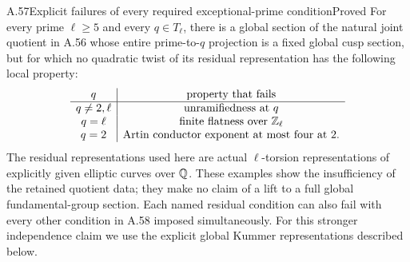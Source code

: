 \begin{statement}{A.57}{Explicit failures of every required exceptional-prime condition}{Proved}
For every prime $\ell\ge5$ and every $q\in T_\ell$, there is a
global section of the natural joint quotient in A.56 whose entire
prime-to-$q$ projection is a fixed global cusp section, but for which
no quadratic twist of its residual representation has the following
local property:
\[
 \begin{array}{c|c}
 q&\text{property that fails}\\\hline
 q\ne2,\ell&\text{unramifiedness at }q\\
 q=\ell&\text{finite flatness over }\mathbb Z_\ell\\
 q=2&\text{Artin conductor exponent at most four at }2.
 \end{array}
\]
The residual representations used here are actual $\ell$-torsion
representations of explicitly given elliptic curves over $\mathbb Q$.
These examples show the insufficiency of the retained quotient data;
they make no claim of a lift to a full global fundamental-group section.
Each named residual condition can also fail with every other condition
in A.58 imposed simultaneously. For this stronger independence claim
we use the explicit global Kummer representations described below.
\end{statement}
